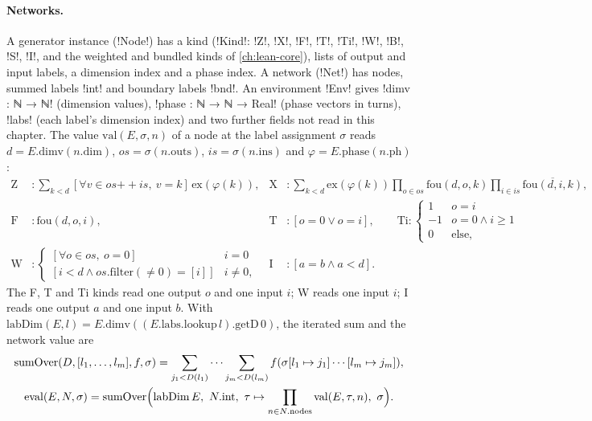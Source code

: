 \paragraph{Networks.} A generator instance (\lean!Node!) has a kind (\lean!Kind!: \lean!Z!, \lean!X!, \lean!F!, \lean!T!, \lean!Ti!, \lean!W!, \lean!B!, \lean!S!, \lean!I!, and the weighted and bundled kinds of \cref{ch:lean-core}), lists of output and input labels, a dimension index and a phase index. A network (\lean!Net!) has nodes, summed labels \lean!int! and boundary labels \lean!bnd!. An environment \lean!Env! gives \lean!dimv : ℕ → ℕ! (dimension values), \lean!phase : ℕ → ℕ → Real! (phase vectors in turns), \lean!labs! (each label's dimension index) and two further fields not read in this chapter. The value $\mathrm{val}(E,\sigma,n)$ of a node at the label assignment $\sigma$ reads $d=E.\mathrm{dimv}(n.\mathrm{dim})$, $os=\sigma(n.\mathrm{outs})$, $is=\sigma(n.\mathrm{ins})$ and $\varphi=E.\mathrm{phase}(n.\mathrm{ph})$:
\begin{align*}
\mathrm{Z}&: \textstyle\sum_{k<d}[\forall v\in os\mathbin{+\!\!+}is,\ v=k]\,\mathrm{ex}(\varphi(k)), &
\mathrm{X}&: \textstyle\sum_{k<d}\mathrm{ex}(\varphi(k))\prod_{o\in os}\mathrm{fou}(d,o,k)\prod_{i\in is}\overline{\mathrm{fou}(d,i,k)},\\
\mathrm{F}&: \mathrm{fou}(d,o,i), &
\mathrm{T}&: [o=0\lor o=i],\qquad \mathrm{Ti}: \begin{cases}1&o=i\\-1&o=0\land i\ge1\\0&\text{else,}\end{cases}\\
\mathrm{W}&: \begin{cases}[\forall o\in os,\ o=0]&i=0\\ [i<d\land os.\mathrm{filter}(\ne0)=[i]]&i\neq0,\end{cases} &
\mathrm{I}&: [a=b\land a<d].
\end{align*}
The F, T and Ti kinds read one output $o$ and one input $i$; W reads one input $i$; I reads one output $a$ and one input $b$. With $\mathrm{labDim}(E,l)=E.\mathrm{dimv}((E.\mathrm{labs.lookup}\,l).\mathrm{getD}\,0)$, the iterated sum and the network value are
\begin{gather*}
\mathrm{sumOver}(D,[l_1,\dots,l_m],f,\sigma)=\sum_{j_1<D(l_1)}\cdots\sum_{j_m<D(l_m)} f(\sigma[l_1\mapsto j_1]\cdots[l_m\mapsto j_m]),\\
\mathrm{eval}(E,N,\sigma)=\mathrm{sumOver}\Bigl(\mathrm{labDim}\,E,\ N.\mathrm{int},\ \tau\mapsto\prod_{n\in N.\mathrm{nodes}}\mathrm{val}(E,\tau,n),\ \sigma\Bigr).
\end{gather*}
